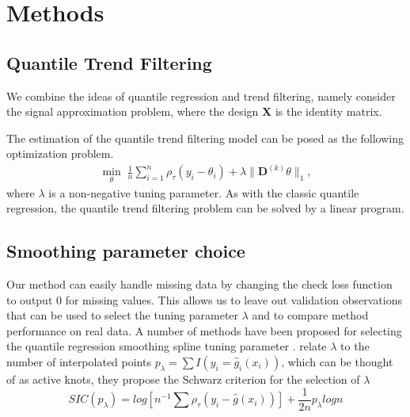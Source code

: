 \documentclass[12pt]{article}
\begin{document}
	\section{Methods}
	
	\subsection{Quantile Trend Filtering}
	
	We combine the ideas of quantile regression and trend filtering, namely consider the signal approximation problem, where the design $\mathbf{X}$ is the identity matrix.
	
	The estimation of the quantile trend filtering model can be posed as the following optimization problem.
	\begin{eqnarray}
	\label{eq:quantile_trend}
	\underset{\theta}{\min}\; \frac{1}{n} \sum_{i=1}^n \rho_\tau(y_i - \theta_i) + \lambda \lVert \mathbf{D}^{(k)} \theta \rVert_1,
	\end{eqnarray}
	where $\lambda$ is a non-negative tuning parameter. As with the classic quantile regression, the quantile trend filtering problem can be solved by a linear program. 
	
	\subsection{Smoothing parameter choice}
	Our method can easily handle missing data by changing the check loss function to output 0 for missing values. This allows us to leave out validation observations that can be used to select the tuning parameter $\lambda$ and to compare method performance on real data. A number of methods have been proposed for selecting the quantile regression smoothing spline tuning parameter \cite{yuan2006gacv}.  \cite{KoenkerNgPortnoy1994} relate $\lambda$ to the number of interpolated points $p_{\lambda} = \sum I(y_i = \widehat{g}_i(x_i))$, which can be thought of as active knots, they propose the Schwarz criterion for the selection of $\lambda$
	\begin{equation}
	SIC(p_{\lambda}) = log[n^{-1}\sum\rho_{\tau}(y_i - \widehat{g}(x_i))] + \frac{1}{2n}p_{\lambda}log n
	\end{equation}
	
\end{document}
